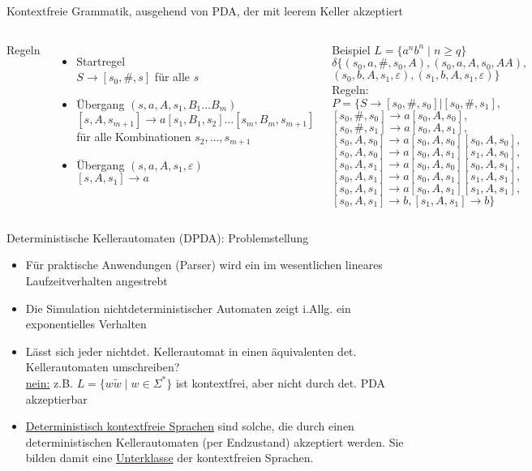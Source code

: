 \begin{frame}{Kontextfreie Grammatik, ausgehend von PDA, der mit leerem Keller akzeptiert}
	\label{Grammatik_aus_PDA}
	\begin{columns}
		Regeln
		\begin{itemize}
			\item Startregel\\
			$S\rightarrow [s_0, \#, s]$ für alle $s$
			\item Übergang $(s,a,A,s_1,B_1\ldots B_m)$\\
			$[s,A,s_{m+1}] \rightarrow a[s_1,B_1,s_2]\ldots[s_m,B_m,s_{m+1}]$ für alle Kombinationen $s_2,\ldots,s_{m+1}$
			\item Übergang $(s,a,A,s_1,\varepsilon)$\\
			$[s,A,s_1]\rightarrow a$
		\end{itemize}
		Beispiel $L=\{a^nb^n \mid n \geq q\}$\\
		 $\delta\{(s_0,a,\#,s_0,A),(s_0,a,A,s_0,AA),$\\
		 \qquad$(s_0,b,A,s_1,\varepsilon),(s_1,b,A,s_1,\varepsilon)\}$\\
		Regeln: $P=\{S \rightarrow [s_0,\#,s_0]|[s_0,\#,s_1],$\\
			$[s_0,\#,s_0]\rightarrow a[s_0,A,s_0],$\\
			$[s_0,\#,s_1]\rightarrow a[s_0,A,s_1],$\\
			$[s_0,A,s_0]\rightarrow a[s_0,A,s_0][s_0,A,s_0],$\\
			$[s_0,A,s_0]\rightarrow a[s_0,A,s_1][s_1,A,s_0],$\\
			$[s_0,A,s_1]\rightarrow a[s_0,A,s_0][s_0,A,s_1],$\\
			$[s_0,A,s_1]\rightarrow a[s_0,A,s_1][s_1,A,s_1],$\\
			$[s_0,A,s_1]\rightarrow a[s_0,A,s_1][s_1,A,s_1],$\\
			$[s_0,A,s_1]\rightarrow b, [s_1,A,s_1]\rightarrow b\}$
	\end{columns}
\end{frame}

\begin{frame}{Deterministische Kellerautomaten (DPDA): Problemstellung}
	\begin{itemize}
		\item Für praktische Anwendungen (Parser) wird ein im wesentlichen lineares Laufzeitverhalten angestrebt
		\item Die Simulation nichtdeterministischer Automaten zeigt i.Allg. ein exponentielles Verhalten
		\item Lässt sich jeder nichtdet. Kellerautomat in einen äquivalenten det. Kellerautomaten umschreiben?\\
		\underline{nein:} z.B. $L=\{w\tilde{w} \mid w\in \Sigma^*\}$ ist kontextfrei, aber nicht durch det. PDA akzeptierbar
		\item \underline{Deterministisch kontextfreie Sprachen} sind solche, die durch einen deterministischen Kellerautomaten (per Endzustand) akzeptiert werden. Sie bilden damit eine \underline{Unterklasse} der kontextfreien Sprachen.
	\end{itemize}
\end{frame}

